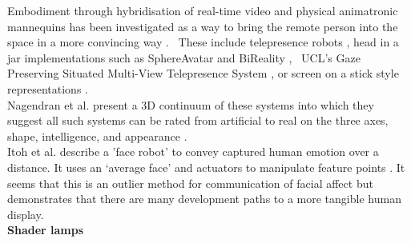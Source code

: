                     Embodiment through hybridisation of real-time video and physical animatronic mannequins has been investigated as a way to bring the remote person into the space in a more convincing way \cite{Lincoln2009, Lincoln:2010it, Raskar2001a}. \ These include telepresence robots \cite{Lee2011b, Sakamoto2007, Tsui2011}, head in a jar implementations such as SphereAvatar \cite{Oyekoya2012, pan2014comparing, Pan2012a} and BiReality \cite{Jouppi2004}, \ UCL's Gaze Preserving Situated Multi-View Telepresence System \cite{Pan2014a}, or screen on a stick style representations \cite{Kristoffersson2013}.\\  
                    Nagendran et al. present a 3D continuum of these systems into which they suggest all such systems can be rated from artificial to real on the three axes, shape, intelligence, and appearance \cite{Nagendran}.\\
                    Itoh et al. describe a 'face robot' to convey captured human emotion over a distance. It uses an `average face' and actuators to manipulate feature points \cite{Itoh2005}. It seems that this is an outlier method for communication of facial affect but demonstrates that there are many development paths to a more tangible human display.\\ 
\textbf{Shader lamps}


